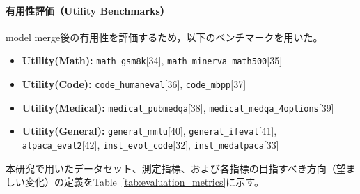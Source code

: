 \documentclass{article}
\begin{document}
\paragraph{有用性評価（Utility Benchmarks）}
model merge後の有用性を評価するため，以下のベンチマークを用いた。

\begin{itemize}
    \item \textbf{Utility(Math):}
    \texttt{math\_gsm8k}[34],
    \texttt{math\_minerva\_math500}[35]

    \item \textbf{Utility(Code):}
    \texttt{code\_humaneval}[36],
    \texttt{code\_mbpp}[37]

    \item \textbf{Utility(Medical):}
    \texttt{medical\_pubmedqa}[38],
    \texttt{medical\_medqa\_4options}[39]

    \item \textbf{Utility(General):}
    \texttt{general\_mmlu}[40],
    \texttt{general\_ifeval}[41],
    \texttt{alpaca\_eval2}[42],
    \texttt{inst\_evol\_code}[32],
    \texttt{inst\_medalpaca}[33]
\end{itemize}

本研究で用いたデータセット、測定指標、および各指標の目指すべき方向（望ましい変化）の定義をTable~\ref{tab:evaluation_metrics}に示す。
\end{document}
